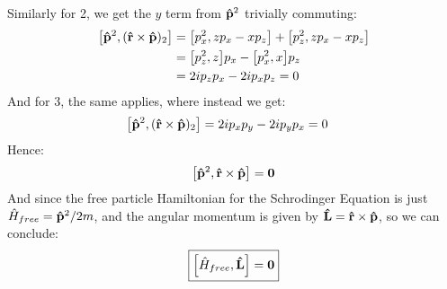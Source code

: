 \documentclass[12pt]{article}
\begin{document}
Similarly for 2, we get the $y$ term from $\vu{p}^2$ trivially commuting:
\begin{align*}
  \comm{\vu{p}^2}{(\vu{r}\times\vu{p})_2}&=
  \comm{p_x^2}{zp_x-xp_z}+\comm{p_z^2}{zp_x-xp_z}\\
  &=\comm{p_z^2}{z}p_x-\comm{p_x^2}{x}p_z\\
  &=2ip_zp_x-2ip_xp_z=0
\end{align*}
And for 3, the same applies, where instead we get:
\begin{align*}
  \comm{\vu{p}^2}{(\vu{r}\times\vu{p})_2}&=
  2ip_xp_y-2ip_yp_x=0
\end{align*}
Hence:
\begin{equation}
  \label{eq:p1a}
  \comm{\vu{p}^2}{\vu{r}\times\vu{p}}=\vb{0}
\end{equation}
And since the free particle Hamiltonian for the Schrodinger Equation is just $\hat{H}_{free}=\vu{p}^2/2m$, and the angular momentum is given by $\vu{L}=\vu{r}\times\vu{p}$, so we can conclude:
\begin{equation}
  \label{eq:p1b}
  \boxed{\comm{\hat{H}_{free}}{\vu{L}}=\vb{0}}
\end{equation}
\newpage
\end{document}
